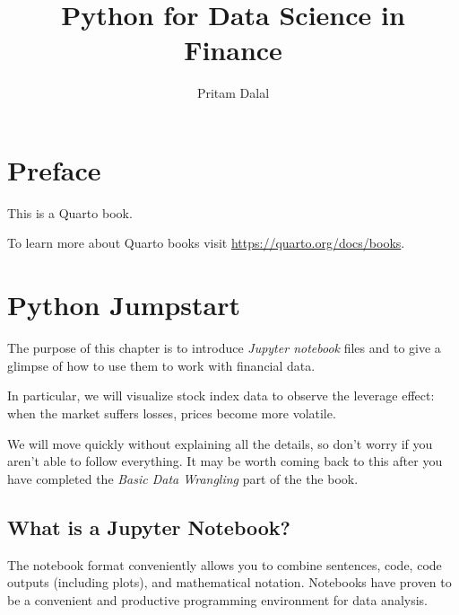 \documentclass[
  letterpaper,
  DIV=11,
  numbers=noendperiod]{scrreprt}
\title{Python for Data Science in Finance}
\author{Pritam Dalal}
\date{}
\renewcommand*\contentsname{Table of contents}
\newcommand\contentsname{Table of contents}
\begin{document}
\maketitle
\ifdefined\Shaded\renewenvironment{Shaded}{\begin{tcolorbox}[breakable, enhanced, borderline west={3pt}{0pt}{shadecolor}, interior hidden, boxrule=0pt, frame hidden, sharp corners]}{\end{tcolorbox}}\fi

\renewcommand*\contentsname{Table of contents}
{
\hypersetup{linkcolor=}
\setcounter{tocdepth}{2}
\tableofcontents
}

\hypertarget{preface}{%
\chapter*{Preface}\label{preface}}


This is a Quarto book.

To learn more about Quarto books visit
\url{https://quarto.org/docs/books}.


\hypertarget{python-jumpstart}{%
\chapter{Python Jumpstart}\label{python-jumpstart}}

The purpose of this chapter is to introduce \emph{Jupyter notebook}
files and to give a glimpse of how to use them to work with financial
data.

In particular, we will visualize stock index data to observe the
leverage effect: when the market suffers losses, prices become more
volatile.

We will move quickly without explaining all the details, so don't worry
if you aren't able to follow everything. It may be worth coming back to
this after you have completed the \emph{Basic Data Wrangling} part of
the the book.

\hypertarget{what-is-a-jupyter-notebook}{%
\section{What is a Jupyter Notebook?}\label{what-is-a-jupyter-notebook}}

The notebook format conveniently allows you to combine sentences, code,
code outputs (including plots), and mathematical notation. Notebooks
have proven to be a convenient and productive programming environment
for data analysis.
\end{document}
